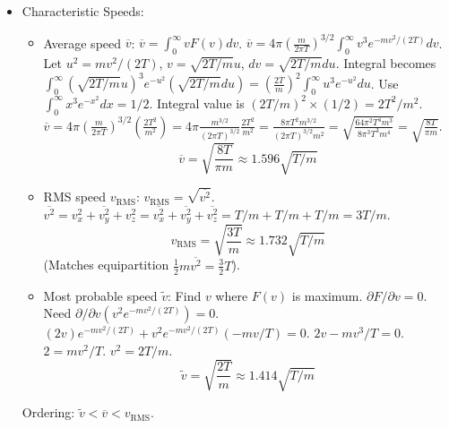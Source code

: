 \documentclass[11pt]{article}
\newcommand{\avg}[1]{\overline{#1}}
\newcommand{\vrms}{v_{\text{RMS}}} %
\newcommand{\vtilde}{\tilde{v}} %
\begin{document}
\begin{itemize}
    \item Characteristic Speeds:
        \begin{itemize}
            \item Average speed $\avg{v}$: $\avg{v} = \int_0^\infty v F(v) dv$.
            $\avg{v} = 4\pi (\frac{m}{2\pi T})^{3/2} \int_0^\infty v^3 e^{-m v^2 / (2T)} dv$.
            Let $u^2 = mv^2/(2T)$, $v=\sqrt{2T/m} u$, $dv=\sqrt{2T/m} du$. Integral becomes $\int_0^\infty (\sqrt{2T/m}u)^3 e^{-u^2} (\sqrt{2T/m}du) = (\frac{2T}{m})^2 \int_0^\infty u^3 e^{-u^2} du$.
            Use $\int_0^\infty x^3 e^{-x^2} dx = 1/2$. Integral value is $(2T/m)^2 \times (1/2) = 2 T^2 / m^2$.
            $\avg{v} = 4\pi (\frac{m}{2\pi T})^{3/2} (\frac{2T^2}{m^2}) = 4\pi \frac{m^{3/2}}{(2\pi T)^{3/2}} \frac{2T^2}{m^2} = \frac{8\pi T^2 m^{3/2}}{ (2\pi T)^{3/2} m^2} = \sqrt{\frac{64 \pi^2 T^4 m^3}{8 \pi^3 T^3 m^4}} = \sqrt{\frac{8 T}{\pi m}}$.
            \[ \avg{v} = \sqrt{\frac{8T}{\pi m}} \approx 1.596 \sqrt{T/m} \]

            \item RMS speed $\vrms$: $\vrms = \sqrt{\avg{v^2}}$.
            $\avg{v^2} = \avg{v_x^2 + v_y^2 + v_z^2} = \avg{v_x^2} + \avg{v_y^2} + \avg{v_z^2} = T/m + T/m + T/m = 3T/m$.
            \[ \vrms = \sqrt{\frac{3T}{m}} \approx 1.732 \sqrt{T/m} \]
            (Matches equipartition $\frac{1}{2}m\avg{v^2} = \frac{3}{2}T$).

            \item Most probable speed $\vtilde$: Find $v$ where $F(v)$ is maximum. $\partial F / \partial v = 0$.
            Need $\partial/\partial v (v^2 e^{-m v^2 / (2T)}) = 0$.
            $(2v) e^{-m v^2 / (2T)} + v^2 e^{-m v^2 / (2T)} (-m v / T) = 0$.
            $2v - m v^3 / T = 0$. $2 = m v^2 / T$. $v^2 = 2T/m$.
            \[ \vtilde = \sqrt{\frac{2T}{m}} \approx 1.414 \sqrt{T/m} \]
        \end{itemize}
        Ordering: $\vtilde < \avg{v} < \vrms$.


\end{itemize}
\end{document}

